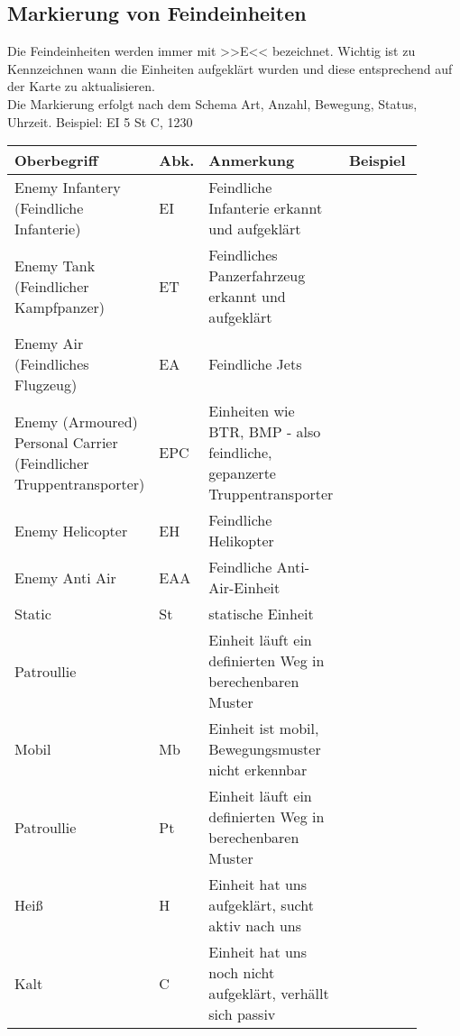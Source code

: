 \pagebreak

\subsection{Markierung von Feindeinheiten}
\label{EnemyUnits}

Die Feindeinheiten werden immer mit >>E<< bezeichnet. Wichtig ist zu Kennzeichnen wann die Einheiten aufgeklärt wurden und diese entsprechend auf der Karte zu aktualisieren. \\
Die Markierung erfolgt nach dem Schema Art, Anzahl, Bewegung, Status, Uhrzeit. Beispiel: EI 5 St  C, 1230

\begin{longtable}{|p{0.3\linewidth}|p{0.05\linewidth}|p{0.35\linewidth}|p{0.2\linewidth}|}
	\hline
	Oberbegriff		&	Abk.	&	Anmerkung 	&	Beispiel \\ 
	\hline
	Enemy Infantery (Feindliche Infanterie)		&	EI	&	Feindliche Infanterie erkannt und aufgeklärt	&	\\ 
	\hline
	Enemy Tank (Feindlicher Kampfpanzer)	&	ET	&	Feindliches Panzerfahrzeug erkannt und aufgeklärt	&	\\ 
	\hline	
	Enemy Air (Feindliches Flugzeug)	&	EA	&	Feindliche Jets	&	\\ 
	\hline	
	Enemy (Armoured) Personal Carrier (Feindlicher Truppentransporter)	&	EPC	&	Einheiten wie BTR, BMP - also feindliche, gepanzerte Truppentransporter	&	\\ 
	\hline	
	Enemy Helicopter	&	EH	&	Feindliche Helikopter	&	\\ 
	\hline	
	Enemy Anti Air	&	EAA		&	Feindliche Anti-Air-Einheit	&	\\ 
	\hline	
	Static	&	St	&	statische Einheit	&	\\ 
	\hline	
	Patroullie	&	&	Einheit läuft ein definierten Weg in berechenbaren Muster	&	\\ 
	\hline	
	Mobil	&	Mb	&	Einheit ist mobil, Bewegungsmuster nicht erkennbar &	\\ 
	\hline	
	Patroullie	&	Pt	&	Einheit läuft ein definierten Weg in berechenbaren Muster	&	\\ 
	\hline
	Heiß	&	H	&	Einheit hat uns aufgeklärt, sucht aktiv nach uns	&	\\ 
	\hline	
	Kalt	&	C	&	Einheit hat uns noch nicht aufgeklärt, verhällt sich passiv	&	\\ 
	\hline		
\end{longtable}